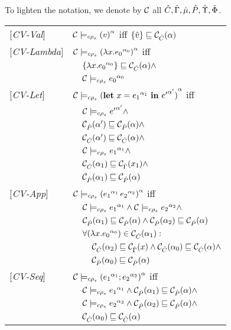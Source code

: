 To lighten the notation, we denote by  $\absC$ all $\hat{C}, \hat{\Gamma}, \hat{\mu}, \hat{P}, \abstack, \absnet$.
\begin{table}
\begin{tabular}{l l l l}
{[\textit{CV-Val}]}&\multicolumn{3}{l}{$ \ccestl {v} $ iff $\{\vat\} \sqsubseteq \Cat(\all)$} \\ 
{[\textit{CV-Lambda}]}&\multicolumn{3}{l}{$ \ccestl {\lam{x}{\lbt 0}} $ iff}\\
&&\multicolumn{2}{l}{$\{\lam{x}{\lbt 0}\} \sqsubseteq \Cat(\all) \wedge $}\\
&&\multicolumn{2}{l}{$ \ccest {\lbt 0}$}\\
{[\textit{CV-Let}]}&\multicolumn{3}{l}{$ \ccestl {\letexpr{x}{\lbt 1}{{e'}^{\all'}}}$ iff}\\
&&\multicolumn{2}{l}{$ \ccest {{e'}^{\all'}} \wedge$} \\
&&\multicolumn{2}{l}{$ \Pat(\all') \sqsubseteq \Pat(\all) \wedge$}\\
&&\multicolumn{2}{l}{$ \Cat(\all') \sqsubseteq \Cat(\all) \wedge$}\\
&&\multicolumn{2}{l}{$\ccest {{e_1}^{\all_1}} \wedge$}\\
&&\multicolumn{2}{l}{ $ \Cat(\all_1) \sqsubseteq \Env(x_1) \wedge$} \\
&&\multicolumn{2}{l}{ $ \Pat(\all_1) \sqsubseteq \Pat(\all) $ }\\
{[\textit{CV-App}]}&\multicolumn{3}{l}{$ \ccestl {\appl {\lbt 1} {\lbt 2}}$ iff}\\
&&\multicolumn{2}{l}{$\ccest {\lbt 1} \wedge \ccest {\lbt 2} \wedge$} \\
&&\multicolumn{2}{l}{$\Pat(\all_1) \sqsubseteq \Pat(\all) \wedge \Pat(\all_2) \sqsubseteq \Pat(\all)$} \\
&&\multicolumn{2}{l}{$\forall (\lam{x}{\lbt 0}) \in \Cat(\all_1) :$}\\
&&&$\Cat(\all_2) \sqsubseteq \Env(x) \wedge \Cat(\all_0) \sqsubseteq \Cat(\all) \wedge$\\
&&&$\Pat(\all_0) \sqsubseteq \Pat(\all) $\\
{[\textit{CV-Seq}]}&\multicolumn{3}{l}{$ \ccestl {\lbt 1;\lbt 2} $ iff } \\ 
&&\multicolumn{2}{l}{$\ccest {\lbt 1} \wedge\Pat(\all_1) \sqsubseteq \Pat(\all) \wedge$} \\
&&\multicolumn{2}{l}{$\ccest {\lbt 2}\wedge \Pat(\all_2) \sqsubseteq \Pat(\all) \wedge$} \\
&&\multicolumn{2}{l}{$\Cat(\all_0) \sqsubseteq \Cat(\all)$} \\

\end{tabular}
\end{table}
